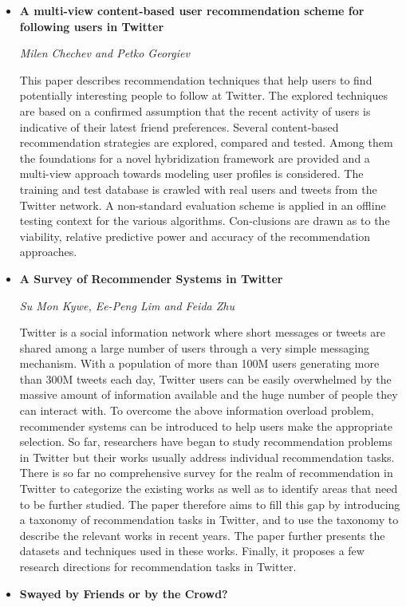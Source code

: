 \begin{itemize}
\item \textbf{A multi-view content-based user recommendation scheme for
following users in Twitter}

\textit{Milen Chechev and Petko Georgiev}

This paper describes recommendation techniques that help users to find
potentially interesting people to follow at Twitter. The explored techniques are
based on a confirmed assumption that the recent activity of users is indicative
of their latest friend preferences. Several content-based recommendation
strategies are explored, compared and tested. Among them the foundations for a
novel hybridization framework are provided and a multi-view approach towards
modeling user profiles is considered. The training and test database is crawled
with real users and tweets from the Twitter network. A non-standard evaluation
scheme is applied in an offline testing context for the various algorithms.
Con-clusions are drawn as to the viability, relative predictive power and
accuracy of the recommendation approaches. 

\item \textbf{A Survey of Recommender Systems in Twitter}

\textit{Su Mon Kywe, Ee-Peng Lim and Feida Zhu}

Twitter is a social information network where short messages or tweets are
shared among a large number of users through a very simple messaging mechanism.
With a population of more than 100M users generating more than 300M tweets each
day, Twitter users can be easily overwhelmed by the massive amount of
information available and the huge number of people they can interact with. To
overcome the above information overload problem, recommender systems can be
introduced to help users make the appropriate selection. So far, researchers
have began to study recommendation problems in Twitter but their works usually
address individual recommendation tasks. There is so far no comprehensive survey
for the realm of recommendation in Twitter to categorize the existing works as
well as to identify areas that need to be further studied. The paper therefore
aims to fill this gap by introducing a taxonomy of recommendation tasks in
Twitter, and to use the taxonomy to describe the relevant works in recent years.
The paper further presents the datasets and techniques used in these works.
Finally, it proposes a few research directions for recommendation tasks in
Twitter.

\item \textbf{Swayed by Friends or by the Crowd?}


\end{itemize}
